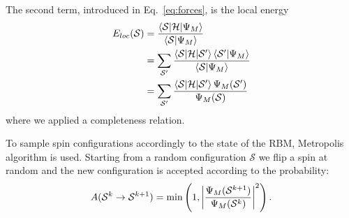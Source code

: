 \documentclass[a4paper,11pt]{article}
\begin{document}
The second term, introduced in Eq.~\ref{eq:forces}, is the local energy
\begin{equation}
    \label{eq:Eloc}
    \centering
    \begin{split}
    E_{loc} (\mathcal{S}) &= \frac{\braket{\mathcal{S} | \mathcal{H} | \Psi_M}}{\braket{\mathcal{S} | \Psi_M}} \\ 
    &= \sum_{\mathcal{S}'} \frac{\braket{\mathcal{S} | \mathcal{H} | \mathcal{S}'} \braket{\mathcal{S}' | \Psi_M}}{\braket{\mathcal{S} | \Psi_M}} \\
    &= \sum_{\mathcal{S}'} \frac{\braket{\mathcal{S} | \mathcal{H} | \mathcal{S}'} \Psi_M(\mathcal{S}')}{\Psi_M(\mathcal{S})}
    \end{split}
\end{equation}
%
where we applied a completeness relation.

To sample spin configurations accordingly to the state of the RBM, Metropolis algorithm is used. Starting from a random configuration $\mathcal{S}$ we flip a spin at random and the new configuration is accepted according to the probability:
\begin{equation}
    \label{eq:Metropolis}
    \centering
    A(\mathcal{S}^k \rightarrow \mathcal{S}^{k +1}) = \min \left(1, \left| \frac{\Psi_M (\mathcal{S}^{k+1})}{\Psi_M (\mathcal{S}^k)} \right|^2 \right).
\end{equation}

\end{document}
